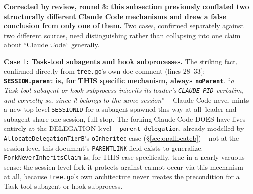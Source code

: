 \documentclass[a4paper,10pt,fleqn]{article}
\newcommand{\fpath}[1]{\texttt{#1}}
\newcommand{\field}[1]{\texttt{#1}}
\begin{document}
\textbf{Corrected by review, round 3: this subsection previously
conflated two structurally different Claude Code mechanisms and drew a
false conclusion from only one of them.} Two cases, confirmed
separately against two different sources, need distinguishing rather
than collapsing into one claim about ``Claude Code'' generally.

\textbf{Case 1: Task-tool subagents and hook subprocesses.} The
striking fact, confirmed directly from \fpath{tree.go}'s own doc
comment (lines 28--33): \textbf{\field{SESSION.parent} is, for THIS
specific mechanism, always \field{noParent}}. ``\emph{a Task-tool
subagent or hook subprocess inherits its leader's \field{CLAUDE\_PID}
verbatim, and correctly so, since it belongs to the same session}'' --
Claude Code never mints a new top-level \field{SESSIONID} for a
subagent spawned this way at all; leader and subagent share one
session, full stop. The forking Claude Code DOES have lives entirely at
the DELEGATION level -- \field{parent\_delegation}, already modelled by
\field{AllocateDelegationTierB}'s \field{oInherited} case
(\S\ref{sec:opallocateb}) -- not at the session level this document's
\field{PARENTLINK} field exists to generalize. \field{ForkNeverInheritsClaim}
is, for THIS case specifically, true in a nearly vacuous sense: the
session-level fork it protects against cannot occur via this mechanism
at all, because \field{tree.go}'s own architecture never creates the
precondition for a Task-tool subagent or hook subprocess.
\end{document}
